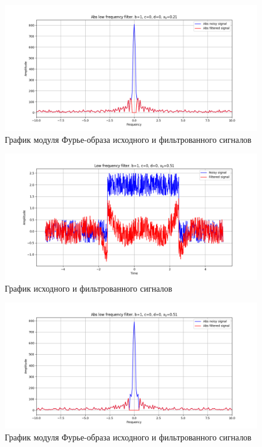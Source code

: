 \documentclass[a4paper, 12pt]{article}
\begin{document}
    \begin{figure}[!htb]
        \centering
        \includegraphics[scale=0.485]{20_abs_u_U_nolow.png}
        \captionsetup{skip=0pt}
        \caption{График модуля Фурье-образа исходного и фильтрованного сигналов}
        \label{fig:fig66}
    \end{figure}
    \begin{figure}[!htb]
        \centering
        \includegraphics[scale=0.485]{21_u_flt_u_nolow.png}
        \captionsetup{skip=0pt}
        \caption{График исходного и фильтрованного сигналов}
        \label{fig:fig67}
    \end{figure}
    \begin{figure}[!htb]
        \centering
        \includegraphics[scale=0.485]{21_abs_u_U_nolow.png}
        \captionsetup{skip=0pt}
        \caption{График модуля Фурье-образа исходного и фильтрованного сигналов}
        \label{fig:fig68}
    \end{figure}
\end{document}
